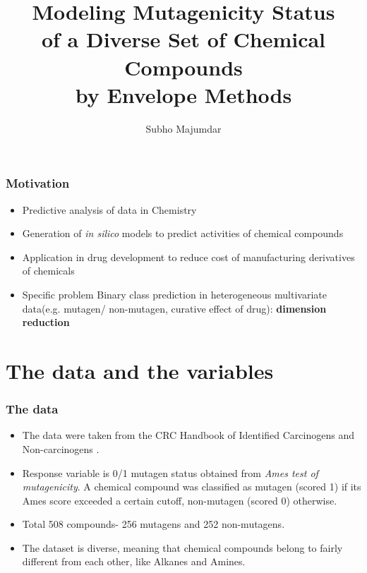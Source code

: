 \documentclass[handout,10pt]{beamer}
\title[Envelopes in Chemometrics]
{\Large  
Modeling Mutagenicity Status\\of a Diverse Set of Chemical Compounds\\by Envelope Methods
}
\author[]
{Subho Majumdar}
\institute[]
{School of Statistics, University of Minnesota}
\date [August 4, 2014]
\begin{document}
\frame{ \titlepage}


\begin{frame}
\frametitle{Motivation}
\begin{itemize}
\item Predictive analysis of data in Chemistry
\vspace{.2cm}
\item Generation of \textit{in silico} models to predict activities of chemical compounds
\vspace{.2cm}
\item Application in drug development to reduce cost of manufacturing derivatives of chemicals
\vspace{.2cm}
\item {\colbbf Specific problem} Binary class prediction in heterogeneous multivariate data(e.g. mutagen/ non-mutagen, curative effect of drug): \textbf{dimension reduction}
\end{itemize}
\end{frame}


\section{The data and the variables}

\begin{frame}
\frametitle{The data}
\begin{itemize}
\item The data were taken from the CRC Handbook of Identified Carcinogens and Non-carcinogens \cite{crc}.
\vspace{.2cm}
\item Response variable is 0/1 mutagen status obtained from \textit{Ames test of mutagenicity}. A chemical compound was classified as mutagen (scored 1) if its Ames score exceeded a certain cutoff, non-mutagen (scored 0) otherwise.
\vspace{.2cm}
\item Total 508 compounds- 256 mutagens and 252 non-mutagens.
\vspace{.2cm}
\item The dataset is diverse, meaning that chemical compounds belong to fairly different from each other, like Alkanes and Amines.
\end{itemize}
\end{frame}
\end{document}
